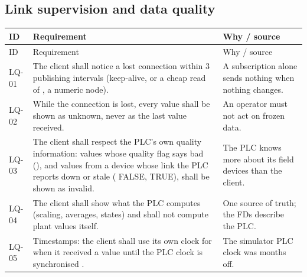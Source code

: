 \documentclass[11pt,a4paper]{article}
\makeatletter
\newenvironment{reqtable}{%
  \begin{small}
  \setlength{\tabcolsep}{4pt}%
  \begin{longtable}{@{}P{14mm}P{86mm}P{60mm}@{}}
  \toprule
  ID & Requirement & Why / source\\
  \midrule
  \endfirsthead
  \toprule
  ID & Requirement & Why / source\\
  \midrule
  \endhead
  \bottomrule
  \endfoot
}{%
  \end{longtable}
  \end{small}
}
\makeatother
\begin{document}
\subsection{Link supervision and data quality}
\begin{reqtable}
LQ-01 & The client shall notice a lost connection within 3 publishing intervals (keep-alive, or a cheap
read of , a numeric node). & A subscription alone sends nothing
when nothing changes.\\
LQ-02 & While the connection is lost, every value shall be shown as unknown, never as the last value
received. & An operator must not act on frozen data.\\
LQ-03 & The client shall respect the PLC's own quality information: values whose quality flag says bad
(), and values from a device whose link the PLC reports down or stale
( FALSE,  TRUE), shall be shown as invalid. & The PLC knows more about its
field devices than the client.\\
LQ-04 & The client shall show what the PLC computes (scaling, averages, states) and shall not compute
plant values itself. & One source of truth; the FDs describe the PLC.\\
LQ-05 & Timestamps: the client shall use its own clock for when it received a value until the PLC
clock is synchronised . & The simulator PLC clock was months off.\\
\end{reqtable}
\end{document}
